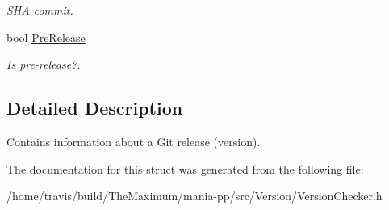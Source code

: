\begin{DoxyCompactItemize}
\begin{DoxyCompactList}\small\item\em S\-H\-A commit. \end{DoxyCompactList}\item 
\hypertarget{structGitVersion_a632eaf068f15348c372389d86b310525}{bool \hyperlink{structGitVersion_a632eaf068f15348c372389d86b310525}{Pre\-Release}}\label{structGitVersion_a632eaf068f15348c372389d86b310525}

\begin{DoxyCompactList}\small\item\em Is pre-\/release?. \end{DoxyCompactList}\end{DoxyCompactItemize}


\subsection{Detailed Description}
Contains information about a Git release (version). 

The documentation for this struct was generated from the following file\-:\begin{DoxyCompactItemize}
\item 
/home/travis/build/\-The\-Maximum/mania-\/pp/src/\-Version/Version\-Checker.\-h\end{DoxyCompactItemize}
